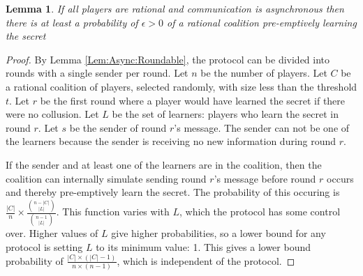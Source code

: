 \documentclass{dalcsthesis}
\newtheorem{lemma}{Lemma}
\begin{document}
\begin{lemma} If all players are rational and communication is asynchronous then there is at least a probability of $\epsilon > 0$ of a rational coalition pre-emptively learning the secret \label{Lem:Async:CoalitionsMayPreempt} \end{lemma}
\begin{proof}
By Lemma \ref{Lem:Async:Roundable}, the protocol can be divided into rounds with a single sender per round.
Let $n$ be the number of players.
Let $C$ be a rational coalition of players, selected randomly, with size less than the threshold $t$.
Let $r$ be the first round where a player would have learned the secret if there were no collusion.
Let $L$ be the set of learners: players who learn the secret in round $r$.
Let $s$ be the sender of round $r$'s message.
The sender can not be one of the learners because the sender is receiving no new information during round $r$.

If the sender and at least one of the learners are in the coalition, then the coalition can internally simulate sending round $r$'s message before round $r$ occurs and thereby pre-emptively learn the secret. The probability of this occuring is $\frac{|C|}{n} \times \frac{\binom{n - |C|}{|L|}}{\binom{n - 1}{|L|}}$. This function varies with $L$, which the protocol has some control over. Higher values of $L$ give higher probabilities, so a lower bound for any protocol is setting $L$ to its minimum value: 1. This gives a lower bound probability of $\frac{|C| \times (|C| - 1)}{n \times (n-1)}$, which is independent of the protocol.
\end{proof}
\end{document}
